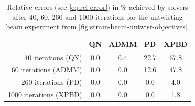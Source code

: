 \begin{table}[h]
\centering
\begin{tabular}{ |r||c|c|c|c| } 
 \hline
 & QN & ADMM & PD & XPBD\\
 \hline
 \hline
    40 iterations (QN) & 0.0 & 0.4 & 22.7 & 67.8 \\ 
    60 iterations (ADMM) & 0.0 & 0.0 & 12.6 & 47.8 \\
    260 iterations (PD) & 0.0 & 0.0 & 0.0 & 4.0 \\
    1000 iterations (XPBD) & 0.0 & 0.0 & 0.0 & 1.8 \\ 
 \hline
\end{tabular}
\caption{Relative errors (see \cref{eq:rel-error}) in \% achieved by solvers after 40, 60, 260 and 1000 iterations for the untwisting beam experiment from 
\autoref{fig:strain-beam-untwist-objectives}.}
\label{fig:rel-errors}
\end{table}

